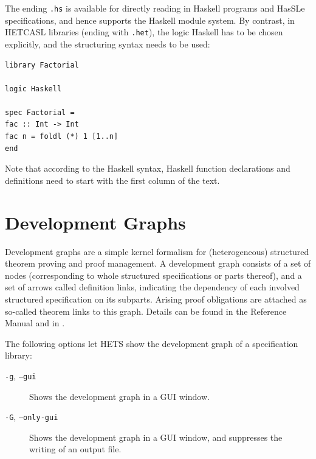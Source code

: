 \documentclass{article}
\newcommand{\normalTEXTSC}[2]{{#1\scriptsize#2}}
\newcommand     {\Hets}{\normalTEXTSC{H}{ETS}\xspace}
\newcommand{\HetCASL}{\normalTEXTSC{H}{ET}\normalTEXTSC{C}{ASL}\xspace}
\begin{document}
The ending \texttt{.hs} is available for directly reading in
Haskell programs and HasSLe specifications, 
and hence supports the Haskell module system.
By contrast, in \HetCASL libraries (ending with \texttt{.het}),
the logic Haskell has to be chosen explicitly, and the \CASL structuring
syntax needs to be used:

\begin{verbatim}
library Factorial

logic Haskell

spec Factorial =
fac :: Int -> Int
fac n = foldl (*) 1 [1..n]
end
\end{verbatim}

Note that according to the Haskell syntax, Haskell function
declarations and definitions need to start with the first column of
the text.




\section{Development Graphs}\label{sec:DevGraph}

Development graphs are a simple kernel formalism for (heterogeneous)
structured theorem proving and proof management.  A development graph
consists of a set of nodes (corresponding to whole structured
specifications or parts thereof), and a set of arrows called
definition links, indicating the dependency of each involved
structured specification on its subparts.  Arising proof obligations
are attached as so-called theorem links to this graph.
Details can be found in the \CASL Reference Manual \cite[IV:4]{CASL/RefManual}
and in \cite{Habil,MossakowskiEtAl05}.

The following options let \Hets show the development graph of
a specification library:
\begin{description}
\item[\texttt{-g}, \texttt{--gui}]  Shows the development graph in a GUI window.
\item[\texttt{-G}, \texttt{--only-gui}] Shows the development graph in a GUI window,
and suppresses the writing of an output file.
\end{description}
\end{document}
